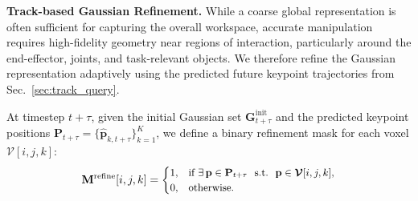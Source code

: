 \smallskip
\noindent \textbf{Track-based Gaussian Refinement.}
%
While a coarse global representation is often sufficient for capturing the overall workspace, accurate manipulation requires high-fidelity geometry near regions of interaction, particularly around the end-effector, joints, and task-relevant objects. We therefore refine the Gaussian representation adaptively using the predicted future keypoint trajectories from Sec.~\ref{sec:track_query}.




At timestep $t+\tau$, given the initial Gaussian set $\mathbf{G}^{\text{init}}_{t+\tau}$ and the predicted keypoint positions $\mathbf{P}_{t+\tau}=\{\hat{\mathbf{p}}_{k,t+\tau}\}_{k=1}^{K}$, we define a binary refinement mask for each voxel $\bm{\mathcal{V}}[i,j,k]$:
\begin{equation}
\small
\mathbf{M}^{\text{refine}}[i,j,k]=
\begin{cases}
1, & \text{if } \exists\, \mathbf{p}\in \mathbf{P}_{t+\tau} ~~\text{s.t.}~~ \mathbf{p}\in \bm{\mathcal{V}}[i,j,k], \\
0, & \text{otherwise}.
\end{cases}
\end{equation}


